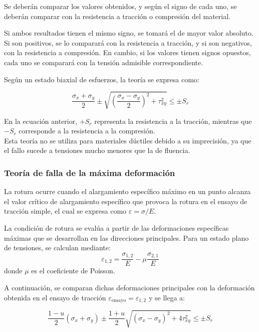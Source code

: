 \documentclass[spanish,11pt,a4paper]{article}
\begin{document}
	Se deberán comparar los valores obtenidos, y según el signo de cada uno, se deberán comparar con la resistencia a tracción o compresión del material.
	
	
	Si ambos resultados tienen el mismo signo, se tomará el de mayor valor absoluto. Si son positivos, se lo comparará con la resistencia a tracción, y si son negativos, con la resistencia a compresión. En cambio, si los valores tienen signos opuestos, cada uno se comparará con la tensión admisible correspondiente.
	
	Según un estado biaxial de esfuerzos, la teoría se expresa como:
	\begin{impo}
		\begin{equation*}
			\dfrac{\sigma_x + \sigma_y}{2} \pm \sqrt{\left(\dfrac{\sigma_x - \sigma_y}{2}\right)^2 + \tau_{xy}^2} \leq \pm S_r
		\end{equation*}
	\end{impo}
	En la ecuación anterior, $+S_r$	representa la resistencia a la tracción, mientras que $−S_r$ corresponde a la resistencia a la compresión. \\
	
	
	Esta teoría no se utiliza para materiales dúctiles debido a su imprecisión, ya que el fallo sucede a tensiones mucho menores que la de fluencia.
	
	\subsubsection{Teoría de falla de la máxima deformación}
	
	La rotura ocurre cuando el alargamiento específico máximo en un punto alcanza el valor crítico de alargamiento específico que provoca la rotura en el ensayo de tracción simple, el cual se expresa como $\varepsilon = \sigma/E$.
	
	La condición de rotura se evalúa a partir de las deformaciones específicas máximas que se desarrollan en las direcciones principales. Para un estado plano de tensiones, se calculan mediante:
	\begin{equation*}
		\varepsilon_{1,2} = \dfrac{\sigma_{1,2}}{E} - \mu \dfrac{\sigma_{2,1}}{E}
	\end{equation*}
	donde $\mu$ es el coeficiente de Poisson.
	
	A continuación, se comparan dichas deformaciones principales con la deformación obtenida en el ensayo de tracción $\varepsilon_\text{ensayo}=\varepsilon_{1,2}$ y se llega a:
	\begin{impo}
		\begin{equation*}
		\dfrac{1-u}{2} (\sigma_x + \sigma_y) \pm \dfrac{1+u}{2} \sqrt{(\sigma_x - \sigma_y)^2 + 4 \tau_{xy}^2} \leq \pm S_r
		\end{equation*}
	\end{impo}
\end{document}
